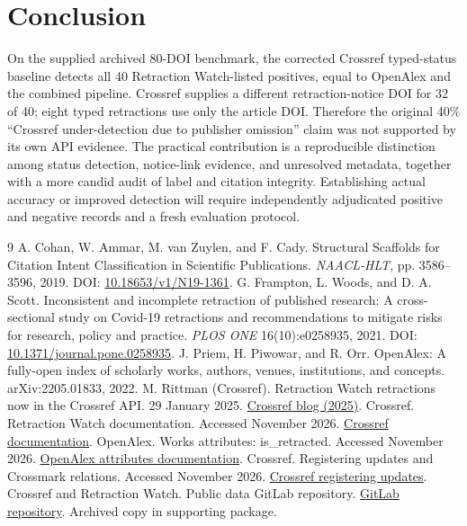 \documentclass[10pt,a4paper,twocolumn]{article}
\begin{document}
\section{Conclusion}
On the supplied archived 80-DOI benchmark, the corrected Crossref typed-status baseline detects all 40 Retraction Watch-listed positives, equal to OpenAlex and the combined pipeline. Crossref supplies a different retraction-notice DOI for 32 of 40; eight typed retractions use only the article DOI. Therefore the original 40\% ``Crossref under-detection due to publisher omission'' claim was not supported by its own API evidence. The practical contribution is a reproducible distinction among status detection, notice-link evidence, and unresolved metadata, together with a more candid audit of label and citation integrity. Establishing actual accuracy or improved detection will require independently adjudicated positive and negative records and a fresh evaluation protocol.

\begin{thebibliography}{9}
 A. Cohan, W. Ammar, M. van Zuylen, and F. Cady. Structural Scaffolds for Citation Intent Classification in Scientific Publications. \emph{NAACL-HLT}, pp. 3586--3596, 2019. DOI: \href{https://doi.org/10.18653/v1/N19-1361}{10.18653/v1/N19-1361}.
 G. Frampton, L. Woods, and D. A. Scott. Inconsistent and incomplete retraction of published research: A cross-sectional study on Covid-19 retractions and recommendations to mitigate risks for research, policy and practice. \emph{PLOS ONE} 16(10):e0258935, 2021. DOI: \href{https://doi.org/10.1371/journal.pone.0258935}{10.1371/journal.pone.0258935}.
 J. Priem, H. Piwowar, and R. Orr. OpenAlex: A fully-open index of scholarly works, authors, venues, institutions, and concepts. arXiv:2205.01833, 2022.
 M. Rittman (Crossref). Retraction Watch retractions now in the Crossref API. 29 January 2025. \href{https://www.crossref.org/blog/retraction-watch-retractions-now-in-the-crossref-api/}{Crossref blog (2025)}.
 Crossref. Retraction Watch documentation. Accessed November 2026. \href{https://www.crossref.org/documentation/retrieve-metadata/retraction-watch/}{Crossref documentation}.
 OpenAlex. Works attributes: is\_retracted. Accessed November 2026. \href{https://help.openalex.org/data/works/attributes/}{OpenAlex attributes documentation}.
 Crossref. Registering updates and Crossmark relations. Accessed November 2026. \href{https://www.crossref.org/documentation/register-maintain-records/maintaining-your-metadata/registering-updates/}{Crossref registering updates}.
 Crossref and Retraction Watch. Public data GitLab repository. \href{https://gitlab.com/crossref/retraction-watch-data}{GitLab repository}. Archived copy in supporting package.
\end{thebibliography}
\end{document}
